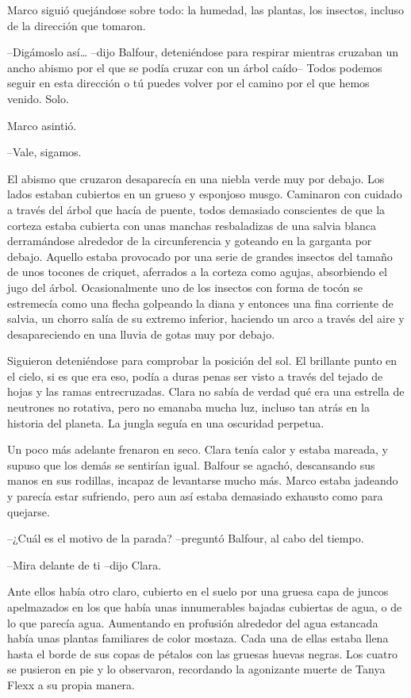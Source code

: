 {Marco siguió quejándose sobre todo: la humedad, las plantas, los
insectos, incluso de la dirección que tomaron.}

{--Digámoslo así\ldots{} --dijo Balfour, deteniéndose para respirar
 mientras cruzaban un ancho abismo por el que se podía cruzar con un
 árbol caído-- Todos podemos seguir en esta dirección o tú puedes volver
por el camino por el que hemos venido. Solo.}

{Marco asintió.}

{--Vale, sigamos.}

{El abismo que cruzaron desaparecía en una niebla verde muy por debajo.
 Los lados estaban cubiertos en un grueso y esponjoso musgo. Caminaron
 con cuidado a través del árbol que hacía de puente, todos demasiado
 conscientes de que la corteza estaba cubierta con unas manchas
 resbaladizas de una salvia blanca derramándose alrededor de la
 circunferencia y goteando en la garganta por debajo. Aquello estaba
 provocado por una serie de grandes insectos del tamaño de unos tocones
 de criquet, aferrados a la corteza como agujas, absorbiendo el jugo del
 árbol. Ocasionalmente uno de los insectos con forma de tocón se
 estremecía como una flecha golpeando la diana y entonces una fina
 corriente de salvia, un chorro salía de su extremo inferior, haciendo un
 arco a través del aire y desapareciendo en una lluvia de gotas muy por
debajo.}

{Siguieron deteniéndose para comprobar la posición del sol. El brillante
 punto en el cielo, si es que era eso, podía a duras penas ser visto a
 través del tejado de hojas y las ramas entrecruzadas. Clara no sabía de
 verdad qué era una estrella de neutrones no rotativa, pero no emanaba
 mucha luz, incluso tan atrás en la historia del planeta. La jungla
seguía en una oscuridad perpetua.}

{Un poco más adelante frenaron en seco. Clara tenía calor y estaba
 mareada, y supuso que los demás se sentirían igual. Balfour se agachó,
 descansando sus manos en sus rodillas, incapaz de levantarse mucho más.
 Marco estaba jadeando y parecía estar sufriendo, pero aun así estaba
demasiado exhausto como para quejarse.}

{--¿Cuál es el motivo de la parada? --preguntó Balfour, al cabo del
tiempo.}

{--Mira delante de ti --dijo Clara.}

{Ante ellos había otro claro, cubierto en el suelo por una gruesa capa de
 juncos apelmazados en los que había unas innumerables bajadas cubiertas
 de agua, o de lo que parecía agua. Aumentando en profusión alrededor del
 agua estancada había unas plantas familiares de color mostaza. Cada una
 de ellas estaba llena hasta el borde de sus copas de pétalos con las
 gruesas huevas negras. Los cuatro se pusieron en pie y lo observaron,
recordando la agonizante muerte de Tanya Flexx a su propia manera.}

